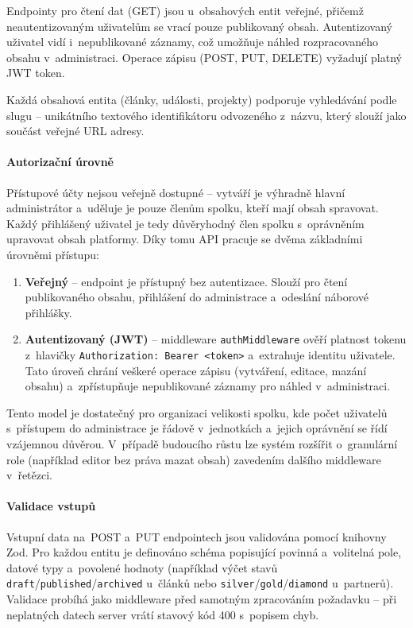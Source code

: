 Endpointy pro čtení dat (GET) jsou u~obsahových entit veřejné, přičemž neautentizovaným uživatelům se vrací pouze publikovaný obsah. Autentizovaný uživatel vidí i~nepublikované záznamy, což umožňuje náhled rozpracovaného obsahu v~administraci. Operace zápisu (POST, PUT, DELETE) vyžadují platný JWT token.

Každá obsahová entita (články, události, projekty) podporuje vyhledávání podle slugu -- unikátního textového identifikátoru odvozeného z~názvu, který slouží jako součást veřejné URL adresy.

\paragraph{Autorizační úrovně}

Přístupové účty nejsou veřejně dostupné -- vytváří je výhradně hlavní administrátor a~uděluje je pouze členům spolku, kteří mají obsah spravovat. Každý přihlášený uživatel je tedy důvěryhodný člen spolku s~oprávněním upravovat obsah platformy. Díky tomu API pracuje se dvěma základními úrovněmi přístupu:

\begin{enumerate}
    \item \textbf{Veřejný} -- endpoint je přístupný bez autentizace. Slouží pro čtení publikovaného obsahu, přihlášení do administrace a~odeslání náborové přihlášky.
    \item \textbf{Autentizovaný (JWT)} -- middleware \texttt{auth\-Middleware} ověří platnost tokenu z~hlavičky \texttt{Authorization:\allowbreak{} Bearer\allowbreak{} <token>} a~extrahuje identitu uživatele. Tato úroveň chrání veškeré operace zápisu (vytváření, editace, mazání obsahu) a~zpřístupňuje nepublikované záznamy pro náhled v~administraci.
\end{enumerate}

Tento model je dostatečný pro organizaci velikosti spolku, kde počet uživatelů s~přístupem do administrace je řádově v~jednotkách a~jejich oprávnění se řídí vzájemnou důvěrou. V~případě budoucího růstu lze systém rozšířit o~granulární role (například editor bez práva mazat obsah) zavedením dalšího middleware v~řetězci.

\paragraph{Validace vstupů}

Vstupní data na~POST a~PUT endpointech jsou validována pomocí knihovny Zod. Pro každou entitu je definováno schéma popisující povinná a~volitelná pole, datové typy a~povolené hodnoty (například výčet stavů \texttt{draft}\allowbreak/\allowbreak\texttt{published}\allowbreak/\allowbreak\texttt{archived} u~článků nebo \texttt{silver}\allowbreak/\allowbreak\texttt{gold}\allowbreak/\allowbreak\texttt{diamond} u~partnerů). Validace probíhá jako middleware před samotným zpracováním požadavku -- při neplatných datech server vrátí stavový kód 400 s~popisem chyb.


